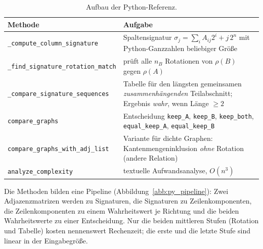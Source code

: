 \begin{table}[!ht]
	\centering
	\small
	\begin{tabularx}{\textwidth}{@{}L{5.4cm}Y@{}}
		\toprule
		Methode & Aufgabe \\
		\midrule
		\texttt{\_compute\_column\_signature} & Spaltensignatur $\sigma_j=\sum_i A_{ij}2^i+j\,2^n$ mit Python-Ganzzahlen beliebiger Größe \\
		\texttt{\_find\_signature\_rotation\_match} & prüft alle $n_B$ Rotationen von $\rho(B)$ gegen $\rho(A)$ \\
		\texttt{\_compare\_signature\_sequences} & Tabelle für den längsten gemeinsamen \emph{zusammenhängenden} Teilabschnitt; Ergebnis \emph{wahr}, wenn Länge $\ge 2$ \\
		\texttt{compare\_graphs} & Entscheidung \texttt{keep\_A}, \texttt{keep\_B}, \texttt{keep\_both}, \texttt{equal\_keep\_A}, \texttt{equal\_keep\_B} \\
		\texttt{compare\_graphs\_with\_adj\_list} & Variante für dichte Graphen: Kantenmengeninklusion \emph{ohne} Rotation (andere Relation) \\
		\texttt{analyze\_complexity} & textuelle Aufwandsanalyse, $O(n^3)$ \\
		\bottomrule
	\end{tabularx}
	\caption{Aufbau der Python-Referenz.}
	\label{tab:py_aufbau}
\end{table}

Die Methoden bilden eine Pipeline (Abbildung~\ref{abb:py_pipeline}): Zwei Adjazenzmatrizen werden zu Signaturen, die Signaturen zu Zeilenkomponenten, die Zeilenkomponenten zu einem Wahrheitswert je Richtung und die beiden Wahrheitswerte zu einer Entscheidung. Nur die beiden mittleren Stufen (Rotation und Tabelle) kosten nennenswert Rechenzeit; die erste und die letzte Stufe sind linear in der Eingabegröße.

